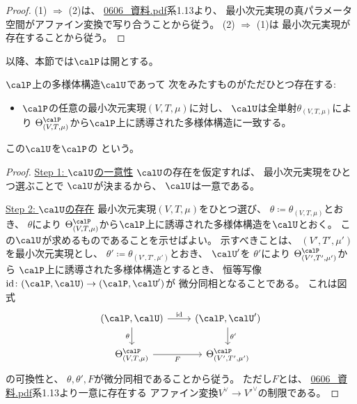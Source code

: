\documentclass[report]{jlreq}
\begin{document}
\begin{proof}
    (1) $\Rightarrow$ (2)は、
    \url{0606_資料.pdf}系1.13より、
    最小次元実現の真パラメータ空間がアファイン変換で写り合うことから従う。
    (2) $\Rightarrow$ (1)は
    最小次元実現が存在することから従う。
\end{proof}

以降、本節では$\calP$は開とする。

\begin{propdef}
    $\calP$上の多様体構造$\calU$であって
    次をみたすものがただひとつ存在する:
    \begin{itemize}
        \item $\calP$の任意の最小次元実現$(V, T, \mu)$に対し、
            $\calU$は全単射$\theta_{(V, T, \mu)}$により
            $\Theta^\calP_{(V, T, \mu)}$から$\calP$上に誘導された多様体構造に一致する。
    \end{itemize}
    この$\calU$を$\calP$の
    という。
\end{propdef}

\begin{proof}
    \uline{Step 1: $\calU$の一意性} \quad
    $\calU$の存在を仮定すれば、
    最小次元実現をひとつ選ぶことで
    $\calU$が決まるから、
    $\calU$は一意である。

    \uline{Step 2: $\calU$の存在} \quad
    最小次元実現$(V, T, \mu)$をひとつ選び、
    $\theta \coloneqq \theta_{(V, T, \mu)}$とおき、
    $\theta$により
    $\Theta^\calP_{(V, T, \mu)}$から$\calP$上に誘導された多様体構造を$\calU$とおく。
    この$\calU$が求めるものであることを示せばよい。
    示すべきことは、
    $(V', T', \mu')$を最小次元実現とし、
    $\theta' \coloneqq \theta_{(V', T', \mu')}$とおき、
    $\calU'$を
    $\theta'$により
    $\Theta^\calP_{(V', T', \mu')}$から
    $\calP$上に誘導された多様体構造とするとき、
    恒等写像$\id \colon (\calP, \calU) \to (\calP, \calU')$が
    微分同相となることである。
    これは図式
    \begin{equation}
        \begin{tikzcd}
            (\calP, \calU)
                \ar{d}[swap]{\theta}
                \ar{r}{\id}
                &(\calP, \calU')
                    \ar{d}{\theta'}
                \\
            \Theta^\calP_{(V, T, \mu)}
                \ar{r}[swap]{F}
                &\Theta^\calP_{(V', T', \mu')}
        \end{tikzcd}
    \end{equation}
    の可換性と、
    $\theta, \theta', F$が微分同相であることから従う。
    ただし$F$とは、
    \url{0606_資料.pdf}系1.13より一意に存在する
    アファイン変換$V^\vee \to V'^\vee$の制限である。
\end{proof}
\end{document}
